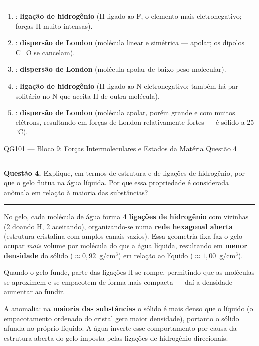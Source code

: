 \documentclass[10pt,a4paper]{article}
\newcommand{\oC}{$^\circ$C}
\newcommand{\questaoheader}[1]{%
  \begin{center}
  {\small\sffamily QG101 --- Bloco 9: Forças Intermoleculares e Estados da Matéria
  \hfill Questão #1}
  \end{center}
  \vspace{-0.3cm}
  \noindent\rule{\textwidth}{0.6pt}
  \vspace{0.1cm}
}
\newcommand{\resolucaosep}{%
  \vspace{0.4cm}
  \noindent\rule{\textwidth}{0.4pt}
  \vspace{0.1cm}

  \noindent{\bf Resolução:}
  \vspace{0.2cm}
}
\begin{document}
\resolucaosep

\begin{enumerate}
  \item {}: \textbf{ligação de hidrogênio} (H ligado ao F, o elemento
        mais eletronegativo; forças H muito intensas).
  \item {}: \textbf{dispersão de London} (molécula linear e simétrica
        --- apolar; os dipolos C=O se cancelam).
  \item {}: \textbf{dispersão de London} (molécula apolar de baixo
        peso molecular).
  \item {}: \textbf{ligação de hidrogênio} (H ligado ao N
        eletronegativo; também há par solitário no N que aceita H de outra
        molécula).
  \item {}: \textbf{dispersão de London} (molécula apolar, porém
        grande e com muitos elétrons, resultando em forças de London
        relativamente fortes ---  é sólido a 25\oC).
\end{enumerate}

\clearpage

\questaoheader{4}

\noindent\textbf{Questão 4.}
Explique, em termos de estrutura e de ligações de hidrogênio, por que o
gelo flutua na água líquida. Por que essa propriedade é considerada
anômala em relação à maioria das substâncias?

\resolucaosep

No gelo, cada molécula de água forma \textbf{4 ligações de hidrogênio}
com vizinhas (2 doando H, 2 aceitando), organizando-se numa
\textbf{rede hexagonal aberta} (estrutura cristalina com amplos canais
vazios). Essa geometria fixa faz o gelo ocupar \emph{mais} volume por
molécula do que a água líquida, resultando em \textbf{menor densidade}
do sólido ($\approx 0{,}92$~g/cm$^3$) em relação ao líquido
($\approx 1{,}00$~g/cm$^3$).

Quando o gelo funde, parte das ligações H se rompe, permitindo que as
moléculas se aproximem e se empacotem de forma mais compacta --- daí a
densidade aumentar ao fundir.

A anomalia: na \textbf{maioria das substâncias} o sólido é mais denso
que o líquido (o empacotamento ordenado do cristal gera maior densidade),
portanto o sólido afunda no próprio líquido. A água inverte esse
comportamento por causa da estrutura aberta do gelo imposta pelas
ligações de hidrogênio direcionais.
\end{document}
